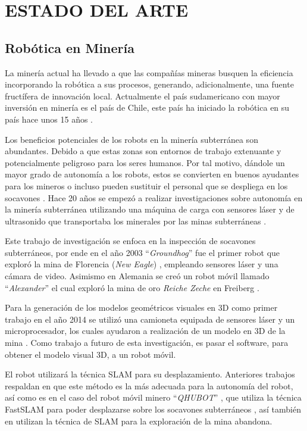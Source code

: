 \chapter{ESTADO DEL ARTE}

\section{Rob\'otica en Miner\'ia}
La minería actual ha llevado a que las compañías mineras busquen la eficiencia incorporando la robótica a sus procesos, generando, adicionalmente, una fuente fructífera de innovación local. Actualmente el país sudamericano con mayor inversión en minería es el país de Chile, este país ha iniciado la robótica en su país hace unos 15 años \cite{Carmona2014}.

Los beneficios potenciales de los robots en la minería subterránea son abundantes. Debido a que estas zonas son entornos de trabajo extenuante y potencialmente peligroso para los seres humanos. Por tal motivo, dándole un mayor grado de autonomía a los robots, estos se convierten en buenos ayudantes para los mineros o incluso pueden sustituir el personal que se despliega en los socavones \cite{Carmona2014}. Hace 20 años se empezó a realizar investigaciones sobre autonomía en la minería subterránea utilizando una máquina de carga con sensores láser y de ultrasonido que transportaba los minerales por las minas subterráneas \cite{Scheding1999}. 

Este trabajo  de investigación  se enfoca en la inspección de socavones subterráneos, por ende en el año 2003 “\textit{Groundhog}” fue el primer robot que exploró la mina de Florencia (\textit{New Eagle}) \cite{Thrun2004}, empleando sensores láser y una cámara de video. Asimismo en Alemania se creó un robot móvil llamado “\textit{Alexander}” el cual exploró la mina de oro \textit{Reiche Zeche} en Freiberg \cite{Grehl2015}.

Para la generación de los modelos geométricos visuales en 3D como primer trabajo en el año 2014 se utilizó una camioneta equipada de sensores láser y un microprocesador, los cuales ayudaron a realización de un modelo en 3D de la mina \cite{Zlot2014}. Como trabajo a futuro de esta investigación, es pasar el software, para obtener el modelo visual 3D, a un robot móvil.
 
El robot utilizará la técnica SLAM para su desplazamiento. Anteriores trabajos respaldan en que este método es la más adecuada para la autonomía del robot, así como es en el caso del robot móvil minero “\textit{QHUBOT}” , que utiliza la técnica FastSLAM para poder desplazarse sobre los socavones subterráneos \cite{Mauricio2015}, así también en \cite{Thrun2004} utilizan la técnica de SLAM para la exploración de la mina abandona. 


